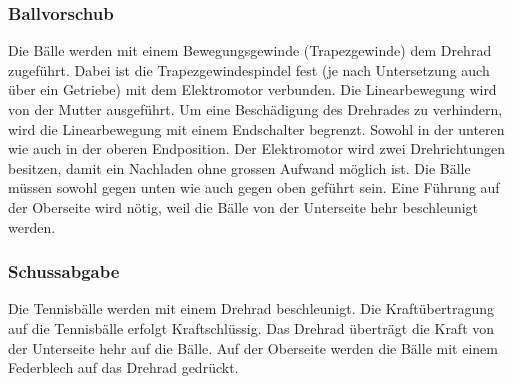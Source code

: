 \subsubsection{Ballvorschub}
Die Bälle werden mit einem Bewegungsgewinde (Trapezgewinde) dem Drehrad zugeführt. Dabei ist die Trapezgewindespindel fest (je nach Untersetzung auch über ein Getriebe) mit dem Elektromotor verbunden. Die Linearbewegung wird von der Mutter ausgeführt. Um eine Beschädigung des Drehrades zu verhindern, wird die Linearbewegung mit einem Endschalter begrenzt. Sowohl in der unteren wie auch in der oberen Endposition. Der Elektromotor wird zwei Drehrichtungen besitzen, damit ein Nachladen ohne grossen Aufwand möglich ist. Die Bälle müssen sowohl gegen unten wie auch gegen oben geführt sein. Eine Führung auf der Oberseite wird nötig, weil die Bälle von der Unterseite hehr beschleunigt werden.

\subsubsection{Schussabgabe}
Die Tennisbälle werden mit einem Drehrad beschleunigt. Die Kraftübertragung auf die Tennisbälle erfolgt Kraftschlüssig. Das Drehrad überträgt die Kraft von der Unterseite hehr auf die Bälle. Auf der Oberseite werden die Bälle mit einem Federblech auf das Drehrad gedrückt.